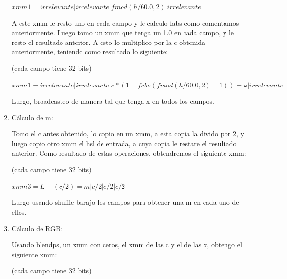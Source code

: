 \documentclass[a4paper]{article}
\begin{document}
\begin{enumerate}
\vspace*{0.3cm}	

$xmm1 = irrelevante|irrelevante|fmod(h/60.0 , 2)|irrelevante$ 		
		
\vspace*{0.3cm}		
		
	A este xmm le resto uno en cada campo y le calculo fabs como comentamos anteriormente. Luego tomo un xmm que tenga un 1.0 en cada campo, y le resto el resultado anterior. A esto lo multiplico por la c obtenida anteriormente, teniendo como resultado lo siguiente:
	
\vspace*{0.3cm}

(cada campo tiene 32 bits)	
	
\vspace*{0.3cm}	

	$xmm1 = irrelevante|irrelevante|c*(1-fabs(fmod(h/60.0 , 2) -1))=x|irrelevante$
		
\vspace*{0.3cm}
	
Luego, broadcasteo de manera tal que tenga x en todos los campos.	
	
	\item Cálculo de m:
	
Tomo el c antes obtenido, lo copio en un xmm, a esta copia la divido por 2, y luego copio otro xmm el hsl de entrada, a cuya copia le restare el resultado anterior. Como resultado de estas operaciones, obtendremos el siguiente xmm:

\vspace*{0.3cm}

(cada campo tiene 32 bits)	
	
\vspace*{0.3cm}	

$xmm3 = L-(c/2)=m | c/2 | c/2 | c/2$
	
\vspace*{0.3cm}


	Luego usando shuffle barajo los campos para obtener una m en cada uno de ellos.
	
	\item Cálculo de RGB:
	
	Usando blendps, un xmm con ceros, el xmm de las c y el de las x, obtengo el siguiente xmm:
	
\vspace*{0.3cm}

(cada campo tiene 32 bits)	
	
\vspace*{0.3cm}	
	

\end{enumerate}
\end{document}
